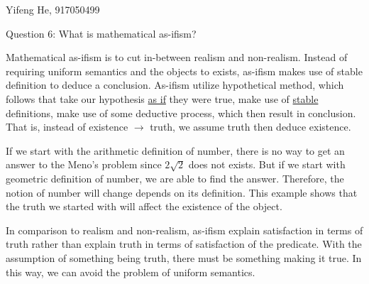 \documentclass[11pt]{article}
\begin{document}
\begin{center}
    Yifeng He, 917050499
\end{center}

\begin{center}
    Question 6: What is mathematical as-ifism?
\end{center}

Mathematical as-ifism is to cut in-between realism and non-realism.
Instead of requiring uniform semantics and the objects to exists,
as-ifism makes use of stable definition to deduce a conclusion.
As-ifism utilize hypothetical method, which follows that
take our hypothesis \underline{as if} they were true,
make use of \underline{stable} definitions,
make use of some deductive process,
which then result in conclusion.
That is, instead of existence $\rightarrow$ truth,
we assume truth then deduce existence. 

If we start with the arithmetic definition of number,
there is no way to get an answer to the Meno's problem since $2\sqrt{2}$ does not exists.
But if we start with geometric definition of number,
we are able to find the answer.
Therefore, the notion of number will change depends on its definition.
This example shows that the truth we started with will affect the existence of the object.

In comparison to realism and non-realism,
as-ifism explain satisfaction in terms of truth
rather than explain truth in terms of satisfaction of the predicate.
With the assumption of something being truth,
there must be something making it true.
In this way, we can avoid the problem of uniform semantics.
\end{document}
